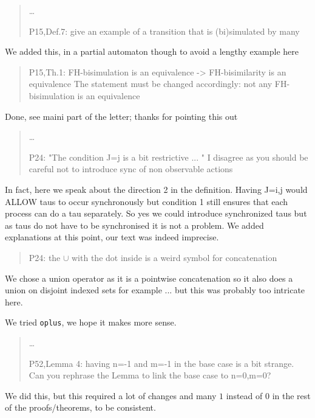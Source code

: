 \documentclass[10pt]{article}
\newenvironment{review}{\bgroup\itshape\begin{quote}}{\end{quote}\egroup}
\begin{document}
\begin{review}
\ldots

P15,Def.7: give an example of a transition that is (bi)simulated by many
\end{review}

We added this, in a partial automaton though to avoid a lengthy example here
\begin{review}
P15,Th.1: FH-bisimulation is an equivalence -> FH-bisimilarity is an equivalence
The statement must be changed accordingly: not any FH-bisimulation is an equivalence
\end{review}
Done, see maini part of the letter; thanks for pointing this out

\begin{review}
\ldots

P24: "The condition J={j} is a bit restrictive ... " I disagree as you should be careful not to introduce sync of non observable actions
\end{review}
 In fact, here we speak about the direction 2 in the definition. Having J={i,j} would ALLOW taus to occur synchronously but condition 1 still ensures that each process can do a tau separately. So yes we could introduce synchronized taus but as taus do not have to be synchronised it is not a problem.
We added explanations at this point, our text was indeed imprecise. 

\begin{review}

P24: the $\cup$ with the dot inside is a weird symbol for concatenation

\end{review}
We chose a union operator as it is a pointwise concatenation so it also does a union on disjoint indexed sets for example ... but this was probably too intricate here.

We tried \texttt{oplus}, we hope it makes more sense.

\begin{review}
\ldots

P52,Lemma 4: having n=-1 and m=-1 in the base case is a bit strange. Can you rephrase the Lemma to link the base case to n=0,m=0?
\end{review}
We did this, but this required a lot of changes and many $1$ instead of $0$ in the rest of the proofs/theorems, to be consistent.


\end{document}
